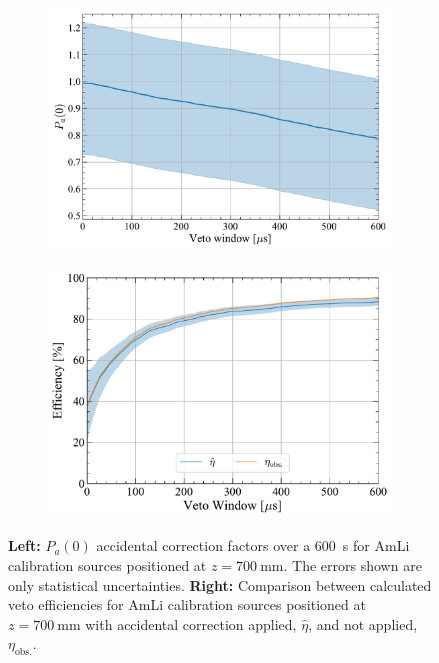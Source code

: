 \begin{figure}[!ht]
    \centering
    \begin{subfigure}[b]{0.49\textwidth}
        \centering
        \includegraphics[width=\textwidth]{figures/VetoEfficiency/SR3AmLi_700mm_Corrections_100k.pdf}
        \caption{}
        \label{fig:VetoEff/SR3AmLi_700mm_Corrections}
    \end{subfigure}
    \hfill
    \begin{subfigure}[b]{0.49\textwidth}
        \centering
        \includegraphics[width=\textwidth]{figures/VetoEfficiency/AmLiAccidentalCheck.pdf}
        \caption{}
        \label{fig:VetoEff/AmLiAccidentalCorrectionImpact}
    \end{subfigure}
    \caption[$P_a(0)$ accidental correction factors over a 600~\textmu s for AmLi calibration sources positioned at $z=700~\text{mm}$ alongside the veto efficiency with the corrections applied.]{\textbf{Left:} $P_a(0)$ accidental correction factors over a 600~\textmu s for AmLi calibration sources positioned at $z=700~\text{mm}$. The errors shown are only statistical uncertainties. \textbf{Right:} Comparison between calculated veto efficiencies for AmLi calibration sources positioned at $z=700~\text{mm}$ with accidental correction applied, $\hat{\eta}$, and not applied, $\eta_\text{obs.}$.}
    \label{fig:VetoEff/AmLiAccidentalPlots}
\end{figure}
